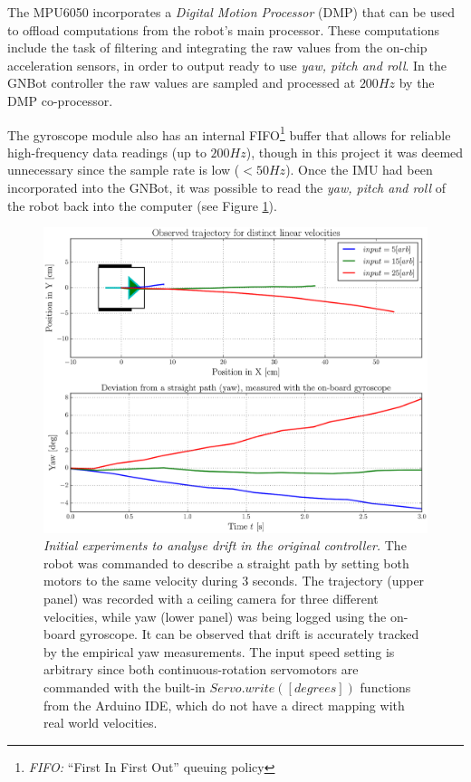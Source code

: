 \documentclass[12pt,twoside]{report}
\begin{document}
The MPU6050 incorporates a \emph{Digital Motion Processor} (DMP) that can be used to offload computations from the robot's main processor. These computations include the task of filtering and integrating the raw values from the on-chip acceleration sensors, in order to output ready to use \emph{yaw, pitch and roll}. In the GNBot controller the raw values are sampled and processed at $200Hz$ by the DMP co-processor.

The gyroscope module also has an internal FIFO\footnote{\emph{FIFO:} ``First In First Out'' queuing policy} buffer that allows for reliable high-frequency data readings (up to $200Hz$), though in this project it was deemed unnecessary since the sample rate is low ($<50Hz$). Once the IMU had been incorporated into the GNBot, it was possible to read the \emph{yaw, pitch and roll} of the robot back into the computer (see Figure \ref{fig:gnbotLinearDrift}).


\begin{figure}[hbtp]
\centerline{
\includegraphics[width=1\linewidth]{gnbot_linear_drift}}
\caption[Initial experiments to analyse drift in the original controller]{\emph{Initial experiments to analyse drift in the original controller.} The robot was commanded to describe a straight path by setting both motors to the same velocity during 3 seconds.
The trajectory (upper panel) was recorded with a ceiling camera for three different velocities, while yaw (lower panel) was being logged using the on-board gyroscope.
It can be observed that drift is accurately tracked by the empirical yaw measurements.
The input speed setting is arbitrary since both continuous-rotation servomotors are commanded with the built-in $Servo.write([degrees])$ functions from the Arduino IDE, which do not have a direct mapping with real world velocities.
}
\label{fig:gnbotLinearDrift}
\end{figure}
\end{document}
